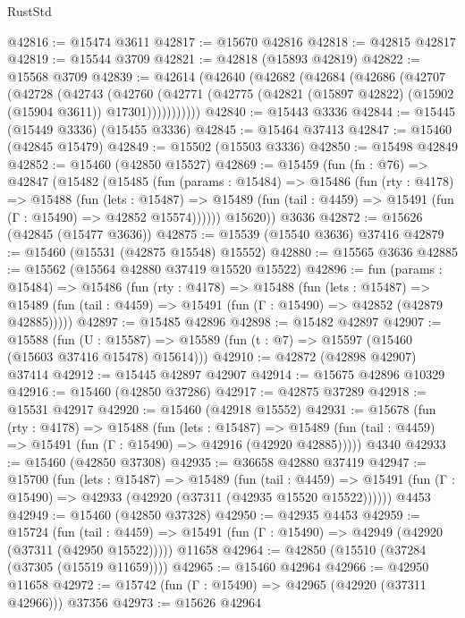 \begin{lexlean}{RustStd}
\begin{coremodule}
@42816 := @15474 @3611
@42817 := @15670 @42816
@42818 := @42815 @42817
@42819 := @15544 @3709
@42821 := @42818 (@15893 @42819)
@42822 := @15568 @3709
@42839 := @42614
    (@42640
      (@42682
        (@42684
          (@42686
            (@42707
              (@42728
                (@42743
                  (@42760
                    (@42771
                      (@42775 (@42821 (@15897 @42822) (@15902 (@15904 @3611)) @17301)))))))))))
@42840 := @15443 @3336
@42844 := @15445 (@15449 @3336) (@15455 @3336)
@42845 := @15464 @37413
@42847 := @15460 (@42845 @15479)
@42849 := @15502 (@15503 @3336)
@42850 := @15498 @42849
@42852 := @15460 (@42850 @15527)
@42869 := @15459
    (fun (fn : @76) =>
    @42847
      (@15482
        (@15485
          (fun (params : @15484) =>
          @15486
            (fun (rty : @4178) =>
            @15488
              (fun (lets : @15487) =>
              @15489 (fun (tail : @4459) => @15491 (fun (Γ : @15490) => @42852 @15574))))))
        @15620))
    @3636
@42872 := @15626 (@42845 (@15477 @3636))
@42875 := @15539 (@15540 @3636) @37416
@42879 := @15460 (@15531 (@42875 @15548) @15552)
@42880 := @15565 @3636
@42885 := @15562 (@15564 @42880 @37419 @15520 @15522)
@42896 := fun (params : @15484) =>
  @15486
    (fun (rty : @4178) =>
    @15488
      (fun (lets : @15487) =>
      @15489 (fun (tail : @4459) => @15491 (fun (Γ : @15490) => @42852 (@42879 @42885)))))
@42897 := @15485 @42896
@42898 := @15482 @42897
@42907 := @15588
    (fun (U : @15587) => @15589 (fun (t : @7) => @15597 (@15460 (@15603 @37416 @15478) @15614)))
@42910 := @42872 (@42898 @42907) @37414
@42912 := @15445 @42897 @42907
@42914 := @15675 @42896 @10329
@42916 := @15460 (@42850 @37286)
@42917 := @42875 @37289
@42918 := @15531 @42917
@42920 := @15460 (@42918 @15552)
@42931 := @15678
    (fun (rty : @4178) =>
    @15488
      (fun (lets : @15487) =>
      @15489 (fun (tail : @4459) => @15491 (fun (Γ : @15490) => @42916 (@42920 @42885)))))
    @4340
@42933 := @15460 (@42850 @37308)
@42935 := @36658 @42880 @37419
@42947 := @15700
    (fun (lets : @15487) =>
    @15489
      (fun (tail : @4459) =>
      @15491 (fun (Γ : @15490) => @42933 (@42920 (@37311 (@42935 @15520 @15522))))))
    @4453
@42949 := @15460 (@42850 @37328)
@42950 := @42935 @4453
@42959 := @15724
    (fun (tail : @4459) => @15491 (fun (Γ : @15490) => @42949 (@42920 (@37311 (@42950 @15522)))))
    @11658
@42964 := @42850 (@15510 (@37284 (@37305 (@15519 @11659))))
@42965 := @15460 @42964
@42966 := @42950 @11658
@42972 := @15742 (fun (Γ : @15490) => @42965 (@42920 (@37311 @42966))) @37356
@42973 := @15626 @42964

\end{coremodule}
\end{lexlean}
